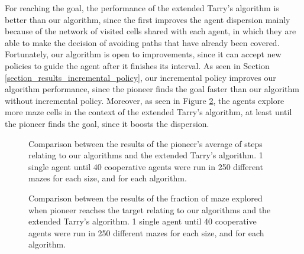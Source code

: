 For reaching the goal, the performance of the extended Tarry's algorithm is better than our algorithm, since the first improves the agent dispersion mainly because of the network of visited cells shared with each agent, in which they are able to make the decision of avoiding paths that have already been covered. Fortunately, our algorithm is open to improvements, since it can accept new policies to guide the agent after it finishes its interval. As seen in Section \ref{section_results_incremental_policy}, our incremental policy improves our algorithm performance, since the pioneer finds the goal faster than our algorithm without incremental policy. Moreover, as seen in Figure \ref{our_algorithm_vs_tarry_fraction}, the agents explore more maze cells in the context of the extended Tarry's algorithm, at least until the pioneer finds the goal, since it boosts the dispersion.

\begin{figure}
    \centering
    \qquad
    \qquad
    \newline
    \qquad
    \caption{Comparison between the results of the pioneer's average of steps relating to our algorithms and the extended Tarry's algorithm. 1 single agent until 40 cooperative agents were run in 250 different mazes for each size, and for each algorithm.}
    \label{our_algorithm_vs_tarry_steps}
\end{figure}

\begin{figure}
    \centering
    \qquad
    \qquad
    \newline
    \qquad
    \caption{Comparison between the results of the fraction of maze explored when pioneer reaches the target relating to our algorithms and the extended Tarry's algorithm. 1 single agent until 40 cooperative agents were run in 250 different mazes for each size, and for each algorithm.}
    \label{our_algorithm_vs_tarry_fraction}
\end{figure}